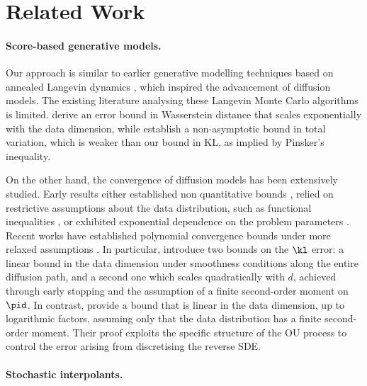 \section{Related Work}
\label{sec:related_work}


\paragraph{Score-based generative models.
}
Our approach is similar to earlier generative modelling techniques based on annealed Langevin dynamics \citep{song2019generative}, which inspired the advancement of diffusion models.
The existing literature analysing these Langevin Monte Carlo algorithms is limited.
\citet{block2022generativemodelingdenoisingautoencoders} derive an error bound in Wasserstein distance that scales exponentially with the data dimension, while \citet{lee2022convergence} establish a non-asymptotic bound in total variation, which is weaker than our bound in \gls*{KL}, as implied by Pinsker's inequality.

On the other hand, the convergence of diffusion models \citep{song2020score, ho2020denoising} has been extensively studied. 
Early results either established non quantitative bounds \citep{pidstrigach2022scorebased}, relied on restrictive assumptions about the data distribution, such as functional inequalities \citep{lee2022convergence}, or exhibited exponential dependence on the problem parameters \citep{ de_bortoli2022convergence}. 
Recent works have established polynomial convergence bounds under more relaxed assumptions \citep{Chen2022ImprovedAO, chen2023sampling, benton2024nearly, li2024towards}. In particular, \citet{Chen2022ImprovedAO} introduce two bounds on the $\kl$ error: a linear bound in the data dimension under smoothness conditions along the entire diffusion path, and a second one which scales quadratically with $d$, achieved through early stopping and the assumption of a finite second-order moment on $\pid$. In contrast, \citet{benton2024nearly} provide a bound that is linear in the data dimension, up to logarithmic factors, assuming only that the data distribution has a finite second-order moment. Their proof exploits the specific structure of the \gls*{OU} process to control the error arising from discretising the reverse \gls*{SDE}.


\paragraph{Stochastic interpolants.}


